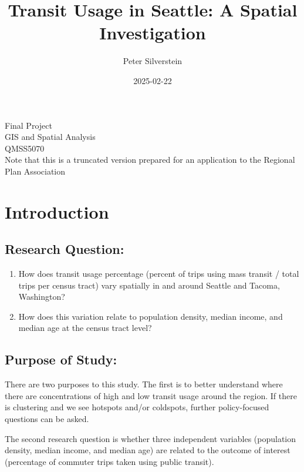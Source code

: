 \documentclass[
]{article}
\title{Transit Usage in Seattle: A Spatial Investigation}
\author{Peter Silverstein}
\date{2025-02-22}
\providecommand{\tightlist}{%
  \setlength{\itemsep}{0pt}\setlength{\parskip}{0pt}}
\begin{document}
\maketitle

\begin{center}
    {\large Final Project}\\[0.5cm]
    {\large GIS and Spatial Analysis}\\[0.5cm]
    {\large QMSS5070}\\[0.5cm]
    {\large Note that this is a truncated version prepared for an application to the Regional Plan Association}\\[0.5cm]
\end{center}

\newpage

\tableofcontents

\newpage

\section{Introduction}\label{introduction}

\subsection{Research Question:}\label{research-question}

\begin{enumerate}
\def\labelenumi{\arabic{enumi}.}
\tightlist
\item
  How does transit usage percentage (percent of trips using mass transit
  / total trips per census tract) vary spatially in and around Seattle
  and Tacoma, Washington?
\item
  How does this variation relate to population density, median income,
  and median age at the census tract level?
\end{enumerate}

\subsection{Purpose of Study:}\label{purpose-of-study}

There are two purposes to this study. The first is to better understand
where there are concentrations of high and low transit usage around the
region. If there is clustering and we see hotspots and/or coldspots,
further policy-focused questions can be asked.

The second research question is whether three independent variables
(population density, median income, and median age) are related to the
outcome of interest (percentage of commuter trips taken using public
transit).
\end{document}
